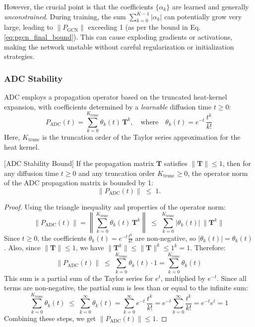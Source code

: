 However, the crucial point is that the coefficients $\{\alpha_k\}$ are learned and generally \textit{unconstrained}. During training, the sum $\sum_{k=0}^{K-1} |\alpha_k|$ can potentially grow very large, leading to $\|P_{\mathrm{GCN}}\|$ exceeding 1 (as per the bound in Eq. \ref{eq:pgcn_final_bound}). This can cause exploding gradients or activations, making the network unstable without careful regularization or initialization strategies.
\subsubsection{ADC Stability}
ADC employs a propagation operator based on the truncated heat-kernel expansion, with coefficients determined by a \textit{learnable} diffusion time $t \ge 0$:
\begin{equation}
P_{\mathrm{ADC}}(t) = \sum_{k=0}^{K_{\mathrm{trunc}}} \theta_k(t)\,\mathbf{T}^k, \quad \text{where} \quad \theta_k(t) = e^{-t}\,\frac{t^k}{k!}
\end{equation}
Here, $K_{\mathrm{trunc}}$ is the truncation order of the Taylor series approximation for the heat kernel.

\begin{theorem}\label{thm:adc_stability}[ADC Stability Bound]
If the propagation matrix $\mathbf{T}$ satisfies $\|\mathbf{T}\| \le 1$, then for any diffusion time $t \ge 0$ and any truncation order $K_{\mathrm{trunc}} \ge 0$, the operator norm of the ADC propagation matrix is bounded by 1:
\begin{equation}
\|P_{\mathrm{ADC}}(t)\| \;\le\; 1.
\end{equation}
\end{theorem}

\begin{proof}
Using the triangle inequality and properties of the operator norm:
\begin{equation}
\|P_{\mathrm{ADC}}(t)\| = \left\|\sum_{k=0}^{K_{\mathrm{trunc}}}\theta_k(t)\,\mathbf{T}^k\right\| \;\le\; \sum_{k=0}^{K_{\mathrm{trunc}}}\left|\theta_k(t)\right|\,\|\mathbf{T}^k\|
\end{equation}
Since $t \ge 0$, the coefficients $\theta_k(t) = e^{-t} \frac{t^k}{k!}$ are non-negative, so $|\theta_k(t)| = \theta_k(t)$. Also, since $\|\mathbf{T}\| \le 1$, we have $\|\mathbf{T}^k\| \le \|\mathbf{T}\|^k \le 1^k = 1$. Therefore:
\begin{equation}
\|P_{\mathrm{ADC}}(t)\| \;\le\; \sum_{k=0}^{K_{\mathrm{trunc}}}\theta_k(t) \cdot 1 = \sum_{k=0}^{K_{\mathrm{trunc}}}\theta_k(t)
\end{equation}
This sum is a partial sum of the Taylor series for $e^t$, multiplied by $e^{-t}$. Since all terms are non-negative, the partial sum is less than or equal to the infinite sum:
\begin{equation}
\sum_{k=0}^{K_{\mathrm{trunc}}}\theta_k(t) \;\le\; \sum_{k=0}^{\infty}\theta_k(t) = \sum_{k=0}^{\infty} e^{-t}\,\frac{t^k}{k!} = e^{-t} \sum_{k=0}^{\infty} \frac{t^k}{k!} = e^{-t} e^{t} = 1
\end{equation}
Combining these steps, we get $\|P_{\mathrm{ADC}}(t)\| \le 1$.
\end{proof}

